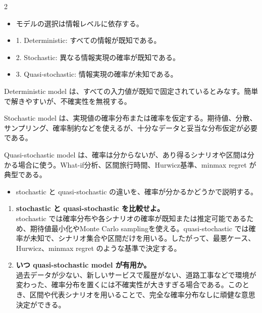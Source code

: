 \clearpage
{}
\begin{multicols}{2}\footnotesize\raggedcolumns
{}
\begin{itemize}
\item モデルの選択は情報レベルに依存する。
\item 1. Deterministic: すべての情報が既知である。
\item 2. Stochastic: 異なる情報実現の確率が既知である。
\item 3. Quasi-stochastic: 情報実現の確率が未知である。
\end{itemize}
Deterministic model は、すべての入力値が既知で固定されているとみなす。簡単で解きやすいが、不確実性を無視する。\par

Stochastic model は、実現値の確率分布または確率を仮定する。期待値、分散、サンプリング、確率制約などを使えるが、十分なデータと妥当な分布仮定が必要である。\par

Quasi-stochastic model は、確率は分からないが、あり得るシナリオや区間は分かる場合に使う。What-if分析、区間旅行時間、Hurwicz基準、minmax regret が典型である。\par
{}
\begin{itemize}
\item stochastic と quasi-stochastic の違いを、確率が分かるかどうかで説明する。
\end{itemize}
\begin{enumerate}
\item \textbf{stochastic と quasi-stochastic を比較せよ。}\\stochastic では確率分布や各シナリオの確率が既知または推定可能であるため、期待値最小化やMonte Carlo samplingを使える。quasi-stochastic では確率が未知で、シナリオ集合や区間だけを用いる。したがって、最悪ケース、Hurwicz、minmax regret のような基準で決定する。
\item \textbf{いつ quasi-stochastic model が有用か。}\\過去データが少ない、新しいサービスで履歴がない、道路工事などで環境が変わった、確率分布を置くには不確実性が大きすぎる場合である。このとき、区間や代表シナリオを用いることで、完全な確率分布なしに頑健な意思決定ができる。
\end{enumerate}
\end{multicols}


